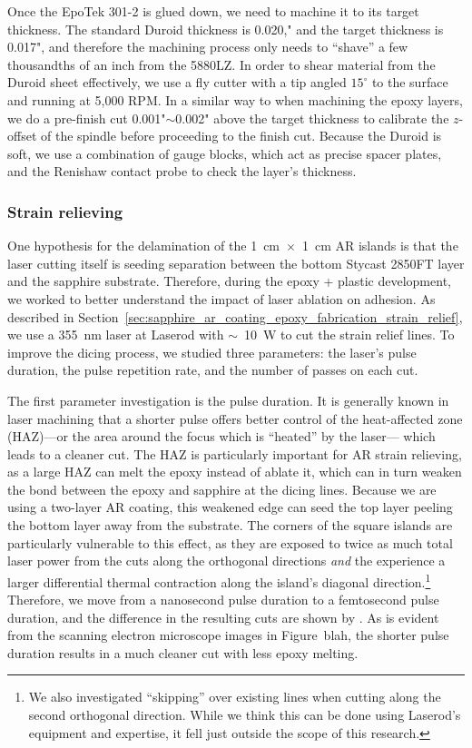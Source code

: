 Once the EpoTek 301-2 is glued down, we need to machine it to its target thickness. The standard Duroid thickness is 0.020," and the target thickness is 0.017", and therefore the machining process only needs to ``shave'' a few thousandths of an inch from the 5880LZ. In order to shear material from the Duroid sheet effectively, we use a fly cutter with a tip angled $15^{\circ}$ to the surface and running at 5,000 RPM. In a similar way to when machining the epoxy layers, we do a pre-finish cut 0.001"$\sim$0.002" above the target thickness to calibrate the $z$-offset of the spindle before proceeding to the finish cut. Because the Duroid is soft, we use a combination of gauge blocks, which act as precise spacer plates, and the Renishaw contact probe to check the layer's thickness.


\subsubsection{Strain relieving}
\label{sec:sapphire_ar_coating_epoxy_plastic_fabrication_5880LZ_strain_relieving}

One hypothesis for the delamination of the 1~cm~$\times$~1~cm AR islands is that the laser cutting itself is seeding separation between the bottom Stycast 2850FT layer and the sapphire substrate. Therefore, during the epoxy + plastic development, we worked to better understand the impact of laser ablation on adhesion. As described in Section~\ref{sec:sapphire_ar_coating_epoxy_fabrication_strain_relief}, we use a 355~nm laser at Laserod with $\sim$~10~W to cut the strain relief lines. To improve the dicing process, we studied three parameters: the laser's pulse duration, the pulse repetition rate, and the number of passes on each cut.

The first parameter investigation is the pulse duration. It is generally known in laser machining that a shorter pulse offers better control of the heat-affected zone (HAZ)---or the area around the focus which is ``heated'' by the laser--- which leads to a cleaner cut. The HAZ is particularly important for AR strain relieving, as a large HAZ can melt the epoxy instead of ablate it, which can in turn weaken the bond between the epoxy and sapphire at the dicing lines. Because we are using a two-layer AR coating, this weakened edge can seed the top layer peeling the bottom layer away from the substrate. The corners of the square islands are particularly vulnerable to this effect, as they are exposed to twice as much total laser power from the cuts along the orthogonal directions \textit{and} the experience a larger differential thermal contraction along the island's diagonal direction.\footnote{We also investigated ``skipping'' over existing lines when cutting along the second orthogonal direction. While we think this can be done using Laserod's equipment and expertise, it fell just outside the scope of this research.} Therefore, we move from a nanosecond pulse duration to a femtosecond pulse duration, and the difference in the resulting cuts are shown by . As is evident from the scanning electron microscope images in Figure~blah, the shorter pulse duration results in a much cleaner cut with less epoxy melting.


